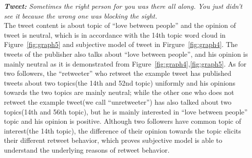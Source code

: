 \documentclass[preprint]{elsarticle}
\begin{document}
\textit{\textbf{Tweet:} Sometimes the right person for you was there all along. You just didn’t see it because the wrong one was blocking the sight.}\\
The tweet content is about topic of ``love between people'' and the opinion of tweet is neutral, which is in accordance with the 14th topic word cloud in Figure~\ref{fig:graph5} and subjective model of tweet in Firgure~\ref{fig:graph4}.
The tweets of the publisher also talks about ``love between people'', and his opinion is mainly neutral as it is demonstrated from Figure~\ref{fig:graph4},\ref{fig:graph5}.
As for two followers, the ``retweeter'' who retweet the example tweet has published tweets about two topics(the 14th and 52nd topic) uniformly and his opinions towards the two topics are mainly neutral;
while the other one who does not retweet the example tweet(we call ``unretweeter'') has also talked about two topics(14th and 56th topic), but he is mainly interested in ``love between people'' topic and his opinion is positive.
Although two followers have common topic of interest(the 14th topic), the difference of their opinion towards the topic elicits their different retweet behavior, which proves subjective model is able to understand the underlying reasons of retweet behavior.
\end{document}
